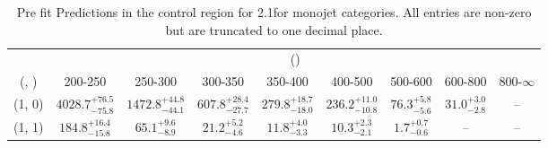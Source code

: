 \begin{table}[h!]
\tiny
\centering
\caption{Pre fit Predictions in the \mj control region for 2.1\ifb for monojet categories. All entries are non-zero but are truncated to one decimal place.\label{tab:predsepnaive_mu_ewk_mono}}
\begin{tabular}
{ccccccccc}
	\hline\hline
	& \multicolumn{8}{c}{\scalht (\gev)} \\ 
	 (\njet,  \nb) & 200-250 & 250-300 & 300-350 & 350-400 & 400-500 & 500-600 & 600-800 & 800-$\infty$ \\ [0.8ex] 
\hline
	(1, 0) & $4028.7^{+ 76.5 }_{- 75.8 }$ & $1472.8^{+ 44.8 }_{- 44.1 }$ & $607.8^{+ 28.4 }_{- 27.7 }$ & $279.8^{+ 18.7 }_{- 18.0 }$ & $236.2^{+ 11.0 }_{- 10.8 }$ & $76.3^{+ 5.8 }_{- 5.6 }$ & $31.0^{+ 3.0 }_{- 2.8 }$ & -- \\[0.5ex] 
	(1, 1) & $184.8^{+ 16.4 }_{- 15.8 }$ & $65.1^{+ 9.6 }_{- 8.9 }$ & $21.2^{+ 5.2 }_{- 4.6 }$ & $11.8^{+ 4.0 }_{- 3.3 }$ & $10.3^{+ 2.3 }_{- 2.1 }$ & $1.7^{+ 0.7 }_{- 0.6 }$ & -- & -- \\[0.5ex] 
	\hline
	\hline
\end{tabular}
\end{table}
